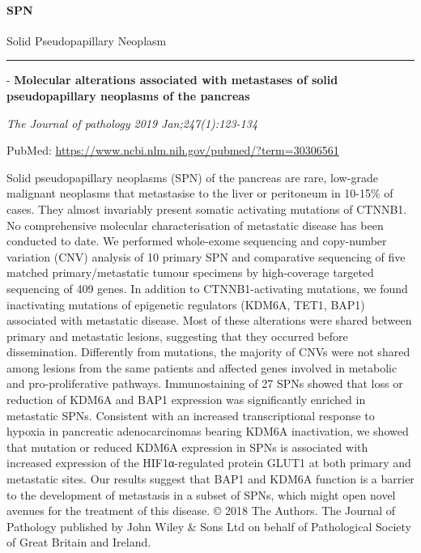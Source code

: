 \documentclass[]{article}
\let\oldparagraph\paragraph
\renewcommand{\paragraph}[1]{\oldparagraph{#1}\mbox{}}
\begin{document}
\hypertarget{spn}{%
\paragraph{SPN}\label{spn}}

Solid Pseudopapillary Neoplasm

\begin{center}\rule{0.5\linewidth}{\linethickness}\end{center}

 - \textbf{Molecular alterations associated with metastases of solid
pseudopapillary neoplasms of the pancreas}

\emph{The Journal of pathology 2019 Jan;247(1):123-134}

PubMed: \url{https://www.ncbi.nlm.nih.gov/pubmed/?term=30306561}

Solid pseudopapillary neoplasms (SPN) of the pancreas are rare,
low-grade malignant neoplasms that metastasise to the liver or
peritoneum in 10-15\% of cases. They almost invariably present somatic
activating mutations of CTNNB1. No comprehensive molecular
characterisation of metastatic disease has been conducted to date. We
performed whole-exome sequencing and copy-number variation (CNV)
analysis of 10 primary SPN and comparative sequencing of five matched
primary/metastatic tumour specimens by high-coverage targeted sequencing
of 409 genes. In addition to CTNNB1-activating mutations, we found
inactivating mutations of epigenetic regulators (KDM6A, TET1, BAP1)
associated with metastatic disease. Most of these alterations were
shared between primary and metastatic lesions, suggesting that they
occurred before dissemination. Differently from mutations, the majority
of CNVs were not shared among lesions from the same patients and
affected genes involved in metabolic and pro-proliferative pathways.
Immunostaining of 27 SPNs showed that loss or reduction of KDM6A and
BAP1 expression was significantly enriched in metastatic SPNs.
Consistent with an increased transcriptional response to hypoxia in
pancreatic adenocarcinomas bearing KDM6A inactivation, we showed that
mutation or reduced KDM6A expression in SPNs is associated with
increased expression of the HIF1α-regulated protein GLUT1 at both
primary and metastatic sites. Our results suggest that BAP1 and KDM6A
function is a barrier to the development of metastasis in a subset of
SPNs, which might open novel avenues for the treatment of this disease.
© 2018 The Authors. The Journal of Pathology published by John Wiley \&
Sons Ltd on behalf of Pathological Society of Great Britain and Ireland.
\end{document}
